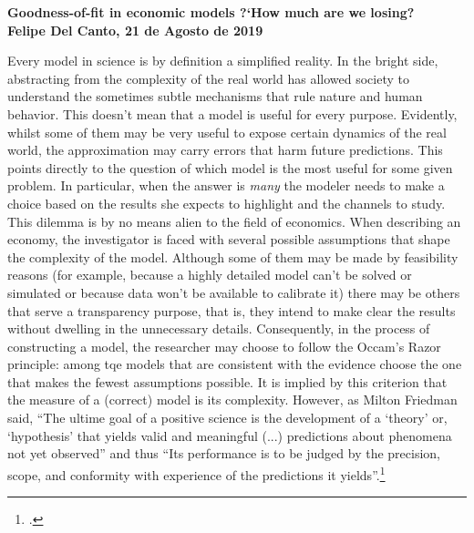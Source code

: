 \documentclass[english, a4paper,12pt]{article}
\begin{document}
\begin{center} \bf \large
	Goodness-of-fit in economic models ?`How much are we losing? \\ Felipe Del Canto, 21 de Agosto de 2019
\end{center}

Every model in science is by definition a simplified reality. In the bright side, abstracting from the complexity of the real world has allowed society to understand the sometimes subtle mechanisms that rule nature and human behavior. This doesn't mean that a model is useful for every purpose. Evidently, whilst some of them may be very useful to expose certain dynamics of the real world, the approximation may carry errors that harm future predictions. This points directly to the question of which model is the most useful for some given problem. In particular, when the answer is \textit{many} the modeler needs to make a choice based on the results she expects to highlight and the channels to study. This dilemma is by no means alien to the field of economics. When describing an economy, the investigator is faced with several possible assumptions that shape the complexity of the model. Although some of them may be made by feasibility reasons (for example, because a highly detailed model can't be solved or simulated or because data won't be available to calibrate it) there may be others that serve a transparency purpose, that is, they intend to make clear the results without dwelling in the unnecessary details. Consequently, in the process of constructing a model, the researcher may choose to follow the Occam's Razor principle: among tqe models that are consistent with the evidence choose the one that makes the fewest assumptions possible. It is implied by this criterion that the measure of a (correct) model is its complexity. However, as Milton Friedman said, ``The ultime goal of a positive science is the development of a `theory' or, `hypothesis' that yields valid and meaningful (...) predictions about phenomena not yet observed'' and thus ``Its performance is to be judged by the precision, scope, and conformity with experience of the predictions it yields''.\footnote{\cite{FriedmanPositive}.}
\end{document}
